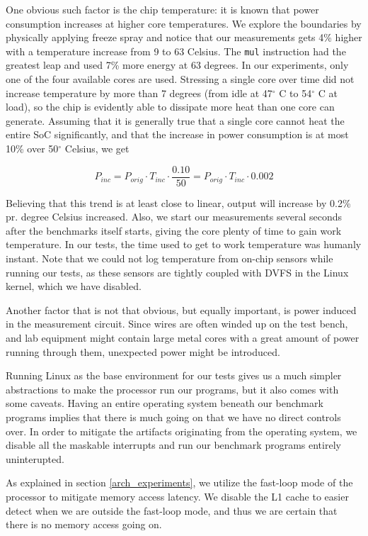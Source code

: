 \label{sec:temperature}
One obvious such factor is the chip temperature: it is known that power
consumption increases at higher core temperatures. We explore the boundaries by
physically applying freeze spray and notice that our measurements gets 4\%
higher with a temperature increase from 9 to 63 Celsius. The \texttt{mul}
instruction had the greatest leap and used 7\% more energy at 63 degrees. In our
experiments, only one of the four available cores are used. Stressing a single
core over time did not increase temperature by more than 7 degrees (from idle at
47$^\circ$ C to 54$^\circ$ C at load), so the chip is evidently able to
dissipate more heat than one core can generate. Assuming that it is generally
true that a single core cannot heat the entire SoC significantly,
and that the increase in power consumption is at most 10\% over 50$^\circ$
Celsius, we get

\begin{equation}
    P_{inc} = P_{orig} \cdot T_{inc} \cdot \frac{0.10}{50} = P_{orig} \cdot T_{inc} \cdot 0.002
\end{equation}

Believing that this trend is at least close to linear, output will increase by
0.2\% pr. degree Celsius increased. Also, we start our measurements several
seconds after the benchmarks itself starts, giving the core plenty of time to
gain work temperature. In our tests, the time used to get to work temperature
was humanly instant. Note that we could not log temperature from on-chip sensors
while running our tests, as these sensors are tightly coupled with DVFS in the
Linux kernel, which we have disabled.

Another factor that is not that obvious, but equally important, is power
induced in the measurement circuit. Since wires are often winded up on the test
bench, and lab equipment might contain large metal cores with a great amount of
power running through them, unexpected power might be introduced.

Running Linux as the base environment for our tests gives us a much simpler
abstractions to make the processor run our programs, but it also comes with some
caveats. Having an entire operating system beneath our benchmark programs
implies that there is much going on that we have no direct controls over. In
order to mitigate the artifacts originating from the operating system, we
disable all the maskable interrupts and run our benchmark programs entirely
uninterupted.

As explained in section \autoref{arch_experiments}, we utilize the fast-loop mode of
the processor to mitigate memory access latency. We disable the L1 cache to
easier detect when we are outside the fast-loop mode, and thus we are certain
that there is no memory access going on.

